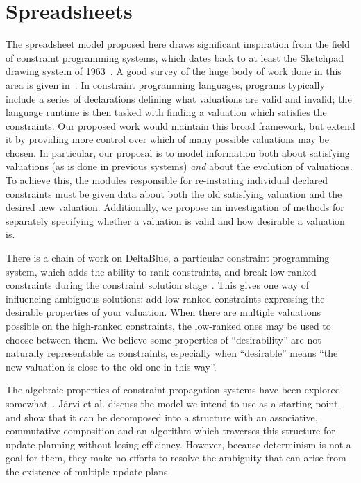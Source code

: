 \section{Spreadsheets}
The spreadsheet model proposed here draws significant inspiration from the
field of constraint programming systems, which dates back to at least the
Sketchpad drawing system of 1963~\cite{sutherland1964sketch}. A good survey
of the huge body of work done in this area is given
in~\cite{wallace1996practical}.
%
In constraint programming languages, programs typically include a series of
declarations defining what valuations are valid and invalid; the language
runtime is then tasked with finding a valuation which satisfies the
constraints. Our proposed work would maintain this broad framework, but
extend it by providing more control over which of many possible valuations
may be chosen. In particular, our proposal is to model information both
about satisfying valuations (as is done in previous systems) \emph{and}
about the evolution of valuations. To achieve this, the modules responsible
for re-instating individual declared constraints must be given data about
both the old satisfying valuation and the desired new valuation.
Additionally, we propose an investigation of methods for separately
specifying whether a valuation is valid and how desirable a valuation is.

There is a chain of work on DeltaBlue, a particular constraint programming
system, which adds the ability to rank constraints, and break low-ranked
constraints during the constraint solution
stage~\cite{sannella1994analyzing,sannella1994skyblue,sannella1993multi}.
This gives one way of influencing ambiguous solutions: add low-ranked
constraints expressing the desirable properties of your valuation. When
there are multiple valuations possible on the high-ranked constraints, the
low-ranked ones may be used to choose between them. We believe some
properties of ``desirability'' are not naturally representable as
constraints, especially when ``desirable'' means ``the new valuation is
close to the old one in this way''.


The algebraic properties of constraint propagation systems have been
explored somewhat~\cite{jarvi2012expressing}. J\"arvi et al. discuss the
model we intend to use as a starting point, and show that it can be
decomposed into a structure with an associative, commutative composition and
an algorithm which traverses this structure for update planning without
losing efficiency. However, because determinism is not a goal for them, they
make no efforts to resolve the ambiguity that can arise from the existence
of multiple update plans.

